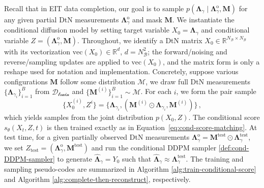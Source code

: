 \documentclass{article}
\def\Eqref#1{Equation~\ref{#1}}
\newcommand{\R}{\mathbb{R}}
\begin{document}
Recall that in EIT data completion, our goal is to sample $p(\mathbf{\Lambda}_\gamma \mid \mathbf{\Lambda}_{\gamma}^{\text{o}},\mathbf{M})$ for any given partial DtN measurements $\mathbf{\Lambda}_{\gamma}^{\text{o}}$ and mask $\mathbf{M}$. We instantiate the conditional diffusion model by setting target variable $X_0=\mathbf{\Lambda}_\gamma$ and conditional variable $Z=(\mathbf{\Lambda}_{\gamma}^{\text{o}},\mathbf{M})$. Throughout, we identify a DtN matrix $X_0\in\R^{N_{\mathcal B}\times N_{\mathcal B}}$ with its vectorization $\mathrm{vec}(X_0)\in\R^{d}$, $d=N_{\mathcal B}^2$; the forward/noising and reverse/sampling updates are applied to $\mathrm{vec}(X_0)$, and the matrix form is only a reshape used for notation and implementation.
Concretely, suppose various configurations $\mathbf{M}$ follow some distribution $\mathcal{M}$, we draw full DtN measurements $\{\mathbf{\Lambda}_{\gamma_i}\}_{i=1}^B$ from $\mathcal{D_{\text{train}}}$ and $\{\mathbf{M}^{(i)}\}_{i=1}^B \sim\mathcal{M}$. For each $i$, we form the pair sample 
\[
\{X_0^{(i)}, Z^i\} = \{\mathbf{\Lambda}_{\gamma_i},(\mathbf{M}^{(i)}\odot \mathbf{\Lambda}_{\gamma_i}, \mathbf{M}^{(i)})\}\,,
\] which yields samples from the joint distribution $p(X_0, Z)$. The conditional score $s_\theta(X_t,Z,t)$ is then trained exactly as in \Eqref{eq:cond-score-matching}. At test time, for a given partially observed DtN measurements $\mathbf\Lambda^{\mathrm{o}}_{\gamma}=\mathbf M^{\text{test}}\odot\mathbf\Lambda_{\gamma}^{\text{test}}$, we set $Z_{\text{test}}=(\mathbf\Lambda^{\mathrm{o}}_{\gamma}, \mathbf{M}^{\text{test}})$ and run the conditional DDPM sampler \ref{def:cond-DDPM-sampler} to generate $\widehat{\mathbf{\Lambda}}_\gamma = Y_0$ such that $\widehat{\mathbf{\Lambda}}_\gamma \approx \mathbf\Lambda_{\gamma}^{\text{test}}$. The training and sampling pseudo-codes are summarized in Algorithm \ref{alg:train-conditional-score} and Algorithm \ref{alg:complete-then-reconstruct}, respectively. 
\end{document}
